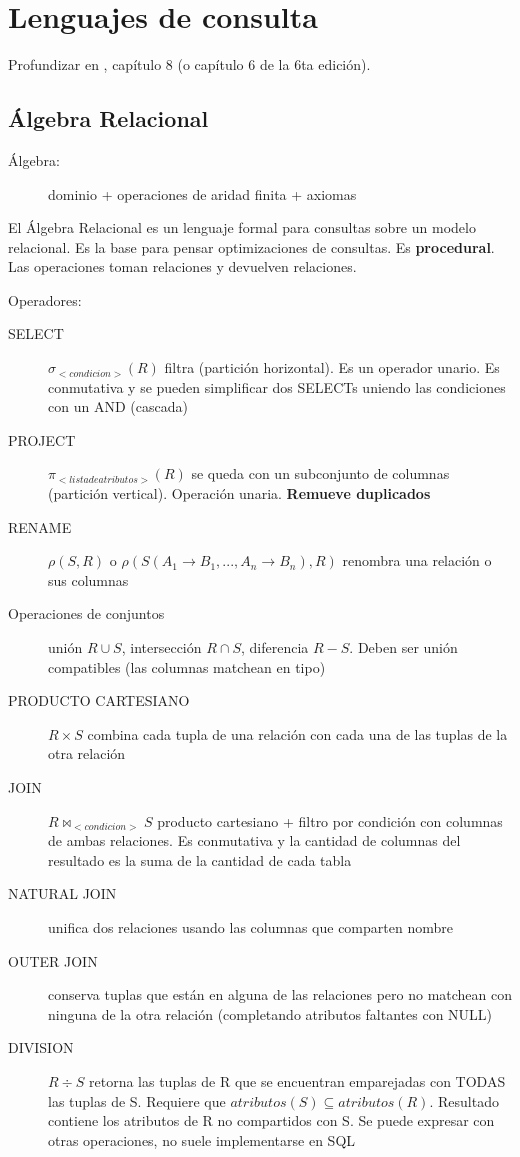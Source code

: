 \section{Lenguajes de consulta}

Profundizar en \cite{elmasri2015}, capítulo 8 (o capítulo 6 de la 6ta edición).

\subsection{Álgebra Relacional}

\begin{description}
	\item[Álgebra:] dominio + operaciones de aridad finita + axiomas
\end{description}

El Álgebra Relacional es un lenguaje formal para consultas sobre un modelo relacional. Es la base para pensar optimizaciones de consultas. Es \textbf{procedural}. Las operaciones toman relaciones y devuelven relaciones.

Operadores:

\begin{description}
	\item[SELECT] $\sigma_{<condicion>}(R)$ filtra (partición horizontal). Es un operador unario. Es conmutativa y se pueden simplificar dos SELECTs uniendo las condiciones con un AND (cascada)
	\item[PROJECT] $\pi_{<lista de atributos>}(R)$ se queda con un subconjunto de columnas (partición vertical). Operación unaria. \textbf{Remueve duplicados}
	\item[RENAME] $\rho(S, R)$ o $\rho(S(A_1 \to B_1, ..., A_n \to B_n), R)$ renombra una relación o sus columnas
	\item[Operaciones de conjuntos] unión $R \cup S$, intersección $R \cap S$, diferencia $R - S$. Deben ser unión compatibles (las columnas matchean en tipo)
	\item[PRODUCTO CARTESIANO] $R \times S$ combina cada tupla de una relación
con cada una de las tuplas de la otra relación
	\item[JOIN] $R \bowtie_{<condicion>} S$ producto cartesiano + filtro por condición con columnas de ambas relaciones. Es conmutativa y la cantidad de columnas del resultado es la suma de la cantidad de cada tabla
	\item[NATURAL JOIN] unifica dos relaciones usando las columnas que comparten nombre
	\item[OUTER JOIN] conserva tuplas que están en alguna de las relaciones pero no matchean con ninguna de la otra relación (completando atributos faltantes con NULL)
	\item[DIVISION] $R \div S$ retorna las tuplas de R que se encuentran emparejadas con TODAS las tuplas de S. Requiere que $atributos(S) \subseteq atributos(R)$. Resultado contiene los atributos de R no compartidos con S. Se puede expresar con otras operaciones, no suele implementarse en SQL
\end{description}

